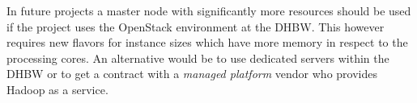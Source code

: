 In future projects a master node with significantly more resources should be used 
if the project uses the OpenStack environment at the \ac{DHBW}.
This however requires new flavors for instance sizes which have more memory in respect to the processing cores.
An alternative would be to use dedicated servers within the \ac{DHBW} or to 
get a contract with a \emph{managed platform} vendor who provides Hadoop as a service.



















